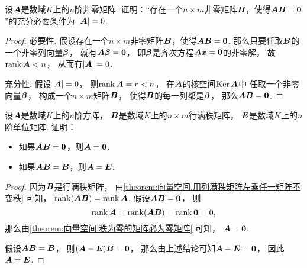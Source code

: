 \begin{example}
设\(\boldsymbol{A}\)是数域\(K\)上的\(n\)阶非零矩阵.
证明：“存在一个\(n \times m\)非零矩阵\(\boldsymbol{B}\)，使得\(\boldsymbol{A}\boldsymbol{B}=\boldsymbol0\)”的充分必要条件为
\(\abs{\boldsymbol{A}}=0\).
\begin{proof}
必要性.
假设存在一个\(n \times m\)非零矩阵\(\boldsymbol{B}\)，使得\(\boldsymbol{A}\boldsymbol{B}=\boldsymbol0\).
那么只要任取\(\boldsymbol{B}\)的一个非零列向量\(\boldsymbol\beta\)，
就有\(\boldsymbol{A}\boldsymbol\beta = \boldsymbol0\)，
即\(\boldsymbol\beta\)是齐次方程\(\boldsymbol{A}\boldsymbol{x}=\boldsymbol0\)的非零解，
故\(\rank\boldsymbol{A}<n\)，
从而有\(\abs{\boldsymbol{A}}=0\).

充分性.
假设\(\abs{\boldsymbol{A}}=0\)，
则\(\rank\boldsymbol{A} = r < n\)，
在\(\boldsymbol{A}\)的核空间\(\operatorname{Ker}\boldsymbol{A}\)中
任取一个非零向量\(\boldsymbol\beta\)，
构成一个\(n \times m\)矩阵\(\boldsymbol{B}\)，
使得\(\boldsymbol{B}\)的每一列都是\(\boldsymbol\beta\)，
那么\(\boldsymbol{A}\boldsymbol{B}=\boldsymbol0\).
\end{proof}
\end{example}
\begin{example}
设\(\boldsymbol{A}\)是数域\(K\)上的\(n\)阶方阵，
\(\boldsymbol{B}\)是数域\(K\)上的\(n \times m\)行满秩矩阵，
\(\boldsymbol{E}\)是数域\(K\)上的\(n\)阶单位矩阵.
证明：\begin{itemize}
	\item 如果\(\boldsymbol{A}\boldsymbol{B}=\boldsymbol0\)，则\(\boldsymbol{A}=\boldsymbol0\).
	\item 如果\(\boldsymbol{A}\boldsymbol{B}=\boldsymbol{B}\)，则\(\boldsymbol{A}=\boldsymbol{E}\).
\end{itemize}
\begin{proof}
因为\(\boldsymbol{B}\)是行满秩矩阵，
由\cref{theorem:向量空间.用列满秩矩阵左乘任一矩阵不变秩} 可知，
\(\rank(\boldsymbol{A}\boldsymbol{B}) = \rank\boldsymbol{A}\).
假设\(\boldsymbol{A}\boldsymbol{B}=\boldsymbol0\)，
则\[
	\rank\boldsymbol{A}=\rank(\boldsymbol{A}\boldsymbol{B})=\rank\boldsymbol0=0,
\]
那么由\cref{theorem:向量空间.秩为零的矩阵必为零矩阵} 可知，
\(\boldsymbol{A}=\boldsymbol0\).

假设\(\boldsymbol{A}\boldsymbol{B}=\boldsymbol{B}\)，
则\((\boldsymbol{A}-\boldsymbol{E})\boldsymbol{B}=\boldsymbol0\)，
那么由上述结论可知\(\boldsymbol{A}-\boldsymbol{E}=\boldsymbol0\)，
因此\(\boldsymbol{A}=\boldsymbol{E}\).
\end{proof}
\end{example}

